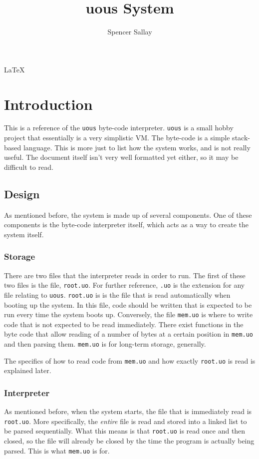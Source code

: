 \documentclass[12pt]{report}
\title{uous System}
\author{Spencer Sallay}
\begin{document}
  \maketitle
  \LaTeX{}
  \tableofcontents
  \newpage
  \chapter{Introduction}
  This is a reference of the \verb|uous| byte-code interpreter.  \verb|uous| is a 
  small hobby project that essentially is a very simplistic VM.  The byte-code is
  a simple stack-based language. This is more just to list how the system works, and
  is not really useful.  The document itself isn't very well formatted yet either,
  so it may be difficult to read.

  \section{Design}
  As mentioned before, the system is made up of several components.  One of these
  components is the byte-code interpreter itself, which acts as a way to create the
  system itself.  

  \subsection{Storage}
  There are two files that the interpreter reads in order to run.
  The first of these two files is the file, \verb|root.uo|.  For further reference,
  \verb|.uo| is the extension for any file relating to \verb|uous|.  \verb|root.uo| is
  is the file that is read automatically when booting up the system.  In this file,
  code should be written that is expected to be run every time the system boots up.
  Conversely, the file \verb|mem.uo| is where to write code that is not expected
  to be read immediately.  There exist functions in the byte code that allow
  reading of a number of bytes at a certain position in \verb|mem.uo| and then parsing
  them.  \verb|mem.uo| is for long-term storage, generally.

  The specifics of how to read code from \verb|mem.uo| and how exactly \verb|root.uo|
  is read is explained later.

  \subsection{Interpreter}
  As mentioned before, when the system starts, the file that is immediately read is
  \verb|root.uo|.  More specifically, the \emph{entire} file is read and stored into
  a linked list to be parsed sequentially.  What this means is that \verb|root.uo| is
  read once and then closed, so the file will already be closed by the time the
  program is actually being parsed.  This is what \verb|mem.uo| is for.
\end{document}
